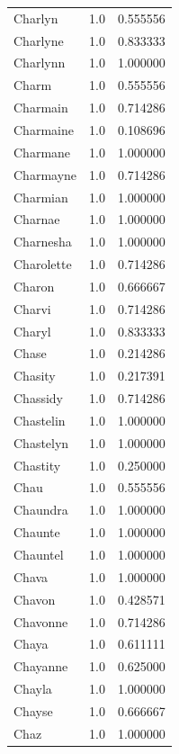 \documentclass[
  letterpaper,
  DIV=11,
  numbers=noendperiod]{scrreprt}
\begin{document}
\begin{tabular}{lrr}
Charlyn         &   1.0 &   0.555556 \\
Charlyne        &   1.0 &   0.833333 \\
Charlynn        &   1.0 &   1.000000 \\
Charm           &   1.0 &   0.555556 \\
Charmain        &   1.0 &   0.714286 \\
Charmaine       &   1.0 &   0.108696 \\
Charmane        &   1.0 &   1.000000 \\
Charmayne       &   1.0 &   0.714286 \\
Charmian        &   1.0 &   1.000000 \\
Charnae         &   1.0 &   1.000000 \\
Charnesha       &   1.0 &   1.000000 \\
Charolette      &   1.0 &   0.714286 \\
Charon          &   1.0 &   0.666667 \\
Charvi          &   1.0 &   0.714286 \\
Charyl          &   1.0 &   0.833333 \\
Chase           &   1.0 &   0.214286 \\
Chasity         &   1.0 &   0.217391 \\
Chassidy        &   1.0 &   0.714286 \\
Chastelin       &   1.0 &   1.000000 \\
Chastelyn       &   1.0 &   1.000000 \\
Chastity        &   1.0 &   0.250000 \\
Chau            &   1.0 &   0.555556 \\
Chaundra        &   1.0 &   1.000000 \\
Chaunte         &   1.0 &   1.000000 \\
Chauntel        &   1.0 &   1.000000 \\
Chava           &   1.0 &   1.000000 \\
Chavon          &   1.0 &   0.428571 \\
Chavonne        &   1.0 &   0.714286 \\
Chaya           &   1.0 &   0.611111 \\
Chayanne        &   1.0 &   0.625000 \\
Chayla          &   1.0 &   1.000000 \\
Chayse          &   1.0 &   0.666667 \\
Chaz            &   1.0 &   1.000000 \\

\end{tabular}
\end{document}
